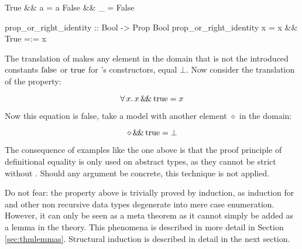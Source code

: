 \begin{code}
True  && a = a
False && _ = False

prop_or_right_identity :: Bool -> Prop Bool
prop_or_right_identity x = x && True =:= x
\end{code}

The translation of \hs{\&\&} makes any element in the domain that is not
the introduced constants $\mathrm{false}$ or $\mathrm{true}$ for 's
constructors, equal $\bot$. Now consider the translation of the
property:

\begin{equation*}
\forall \, x . \, x \, \mathrm{\&\!\&} \, \mathrm{true} = x
\end{equation*}

Now this equation is false, take a model with another element $\diamond$ in the
domain:

$$\diamond \, \mathrm{\&\!\&} \, \mathrm{true} = \bot$$

The consequence of examples like the one above is that the proof
principle of definitional equality is only used on abstract types, as
they cannot be strict without . Should any argument be
concrete, this technique is not applied.

Do not fear: the property above is trivially proved by
induction, as induction for  and other non recursive data
types degenerate into mere case enumeration. However, it can only be
seen as a meta theorem as it cannot simply be added as a lemma in the
theory. This phenomena is described in more detail in Section
\ref{sec:thmlemmas}. Structural induction is described in detail in
the next section.



